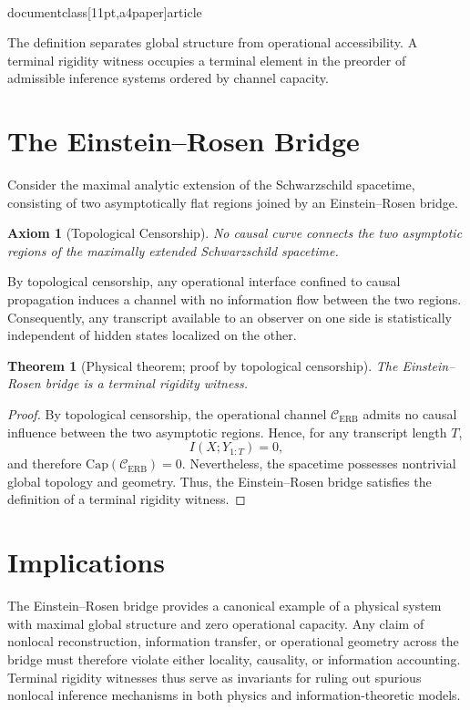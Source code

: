 \\documentclass[11pt,a4paper]{article}
\newtheorem{theorem}{Theorem}
\newtheorem{axiom}{Axiom}
\newcommand{\Capacity}{\mathrm{Cap}}
\begin{document}
The definition separates global structure from operational accessibility. A terminal
rigidity witness occupies a terminal element in the preorder of admissible inference
systems ordered by channel capacity.

\section{The Einstein--Rosen Bridge}

Consider the maximal analytic extension of the Schwarzschild spacetime, consisting of two
asymptotically flat regions joined by an Einstein--Rosen bridge.

\begin{axiom}[Topological Censorship]
No causal curve connects the two asymptotic regions of the maximally extended Schwarzschild
spacetime.
\end{axiom}

By topological censorship, any operational interface confined to causal propagation induces
a channel with no information flow between the two regions. Consequently, any transcript
available to an observer on one side is statistically independent of hidden states localized
on the other.

\begin{theorem}[Physical theorem; proof by topological censorship]
The Einstein--Rosen bridge is a terminal rigidity witness.
\end{theorem}

\begin{proof}
By topological censorship, the operational channel $\mathcal C_{\mathrm{ERB}}$ admits no
causal influence between the two asymptotic regions. Hence, for any transcript length $T$,
\[
I(X;Y_{1:T}) = 0,
\]
and therefore $\Capacity(\mathcal C_{\mathrm{ERB}})=0$. Nevertheless, the spacetime possesses
nontrivial global topology and geometry. Thus, the Einstein--Rosen bridge satisfies the
definition of a terminal rigidity witness.
\end{proof}

\section{Implications}

The Einstein--Rosen bridge provides a canonical example of a physical system with maximal
global structure and zero operational capacity. Any claim of nonlocal reconstruction,
information transfer, or operational geometry across the bridge must therefore violate
either locality, causality, or information accounting. Terminal rigidity witnesses thus
serve as invariants for ruling out spurious nonlocal inference mechanisms in both physics
and information-theoretic models.
\end{document}
